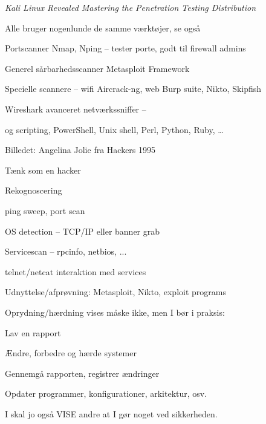 \documentclass[Screen16to9,17pt]{foils}
\begin{document}


\emph{Kali Linux Revealed  Mastering the Penetration Testing Distribution}





\begin{list2}
\item Alle bruger nogenlunde de samme værktøjer, se også 
\item Portscanner Nmap, Nping -- tester porte, godt til firewall admins 
\item Generel sårbarhedsscanner Metasploit Framework 
\item Specielle scannere -- wifi Aircrack-ng, web Burp suite, Nikto, Skipfish 
\item Wireshark avanceret netværkssniffer -- 
\item og scripting, PowerShell, Unix shell, Perl, Python, Ruby, \ldots
\end{list2}

Billedet: Angelina Jolie fra Hackers 1995



\begin{list1}
\item Tænk som en hacker
\item Rekognoscering
\begin{list2}
\item ping sweep, port scan
\item OS detection -- TCP/IP eller banner grab
\item Servicescan -- rpcinfo, netbios, ...
\item telnet/netcat interaktion med services
\end{list2}
\item Udnyttelse/afprøvning: Metasploit, Nikto, exploit programs
\item Oprydning/hærdning vises måske ikke, men I bør i praksis:
\begin{list2}
\item Lav en rapport
\item Ændre, forbedre og hærde systemer
\item Gennemgå rapporten, registrer ændringer
\item Opdater programmer, konfigurationer, arkitektur, osv.
\end{list2}
\item I skal jo også VISE andre at I gør noget ved sikkerheden.
\end{list1}
\end{document}

